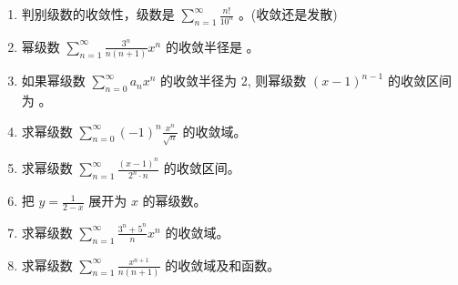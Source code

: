 \documentclass[12pt, a4paper]{article}
\begin{document}
\begin{enumerate}
    \item 判别级数的收敛性，级数是 $ \sum_{n=1}^{\infty}\frac{n!}{10^{n}} $ \underline{\hspace{2cm}}。(收敛还是发散)

    \item 幂级数 $ \sum_{n=1}^{\infty}\frac{3^{n}}{n(n+1)}x^{n} $ 的收敛半径是 \underline{\hspace{2cm}}。

    \item 如果幂级数 $ \sum_{n=0}^{\infty} a_{n} x^{n} $ 的收敛半径为 2, 则幂级数 $ (x-1)^{n-1} $ 的收敛区间为 \underline{\hspace{2cm}}。

    \item 求幂级数 $ \sum_{n=0}^{\infty} (-1)^{n} \frac{x^{n}}{\sqrt{n}} $ 的收敛域。

    \item 求幂级数 $ \sum_{n=1}^{\infty} \frac{(x-1)^{n}}{2^{n} \cdot n} $ 的收敛区间。

    \item 把 $ y = \frac{1}{2-x} $ 展开为 $x$ 的幂级数。

    \item 求幂级数 $ \sum_{n=1}^{\infty} \frac{3^{n} + 5^{n}}{n} x^{n} $ 的收敛域。

    \item 求幂级数 $ \sum_{n=1}^{\infty} \frac{x^{n+1}}{n(n+1)} $ 的收敛域及和函数。
\end{enumerate}
\end{document}
